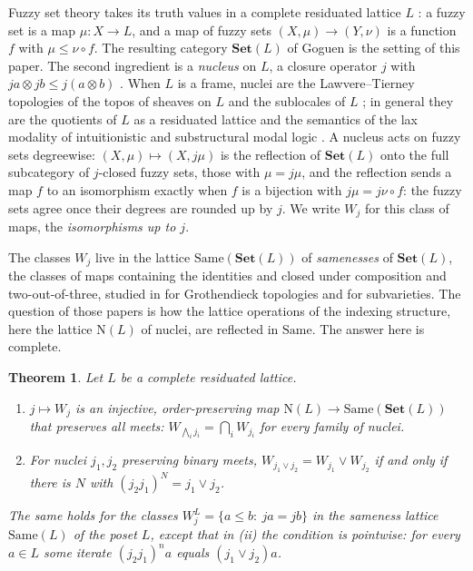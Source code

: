 \documentclass[11pt]{amsart}
\newtheorem{thm}{Theorem}[section]
\theoremstyle{definition}
\newcommand{\Nuc}{\mathrm{N}}
\newcommand{\Same}{\mathrm{Same}}
\newcommand{\FSet}{\mathbf{Set}}
\begin{document}
Fuzzy set theory takes its truth values in a complete residuated lattice $L$
\cite{Goguen,Hajek}: a fuzzy set is a map $\mu\colon X\to L$, and a map of
fuzzy sets $(X,\mu)\to(Y,\nu)$ is a function $f$ with $\mu\le\nu\circ f$. The
resulting category $\FSet(L)$ of Goguen \cite{Goguen} is the setting of this
paper. The second ingredient is a \emph{nucleus} on $L$, a closure operator
$j$ with $ja\otimes jb\le j(a\otimes b)$ \cite{Rosenthal,GJKO}. When $L$ is a
frame, nuclei are the Lawvere--Tierney topologies of the topos of sheaves on
$L$ and the sublocales of $L$ \cite{Johnstone}; in general they are the
quotients of $L$ as a residuated lattice and the semantics of the lax
modality of intuitionistic and substructural modal logic
\cite{FM,Laxjoin}. A nucleus acts on fuzzy sets degreewise: $(X,\mu)\mapsto
(X,j\mu)$ is the reflection of $\FSet(L)$ onto the full subcategory of
$j$-closed fuzzy sets, those with $\mu=j\mu$, and the reflection sends a map
$f$ to an isomorphism exactly when $f$ is a bijection with $j\mu=j\nu\circ f$:
the fuzzy sets agree once their degrees are rounded up by $j$. We write $W_j$
for this class of maps, the \emph{isomorphisms up to $j$}.

The classes $W_j$ live in the lattice $\Same(\FSet(L))$ of \emph{samenesses}
of $\FSet(L)$, the classes of maps containing the identities and closed under
composition and two-out-of-three, studied in \cite{Same,Topjoin,Finitejoin,
Varieties} for Grothendieck topologies and for subvarieties. The question of
those papers is how the lattice operations of the indexing structure, here
the lattice $\Nuc(L)$ of nuclei, are reflected in $\Same$. The answer here is
complete.

\begin{thm}\label{thm:main}
Let $L$ be a complete residuated lattice.
\begin{enumerate}
\item[(i)] $j\mapsto W_j$ is an injective, order-preserving map
$\Nuc(L)\to\Same(\FSet(L))$ that preserves all meets:
$W_{\bigwedge_ij_i}=\bigcap_iW_{j_i}$ for every family of nuclei.
\item[(ii)] For nuclei $j_1,j_2$ preserving binary meets,
$W_{j_1\vee j_2}=W_{j_1}\vee W_{j_2}$ if and only if there is $N$ with
$(j_2j_1)^N=j_1\vee j_2$.
\end{enumerate}
The same holds for the classes $W_j^L=\{a\le b:\ ja=jb\}$ in the sameness
lattice $\Same(L)$ of the poset $L$, except that in (ii) the condition is
pointwise: for every $a\in L$ some iterate $(j_2j_1)^na$ equals $(j_1\vee j_2)a$.
\end{thm}
\end{document}
